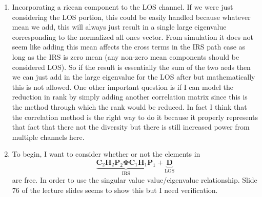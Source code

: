 \documentclass[12pt,a4paper]{report}
\begin{document}
\begin{enumerate}
 \item
 Incorporating a ricean component to the LOS channel. If we were just considering the LOS portion, this could be
 easily handled because whatever mean we add, this will always just result in a single large eigenvalue corresponding to the normalized all ones vector. From simulation it does not seem like adding this mean affects the cross terms in the IRS path case as long as the IRS is zero mean (any non-zero mean components should be considered LOS).
 So if the result is essentially the sum of the two aeds then we can just add in the large eigenvalue for the LOS after but mathematically this is not allowed. One other important question is if I can model the reduction in rank by simply adding another correlation matrix since this is the method through which the rank would be reduced. In fact I think that the correlation method is the right way to do it because it properly represents that fact that there not the diversity but there is still increased power from multiple channels here.
 
\item 
To begin, I want to consider whether or not the elements in 
\begin{equation}
\underbrace{\mathbf{C}_{2}\mathbf{H}_{2}\mathbf{P}_{2}\boldsymbol{\Phi}\mathbf{C}_{1}\mathbf{H}_{1}\mathbf{P}_{1}}_{\text{IRS}} + \underbrace{\mathbf{D}}_{\text{LOS} }
\end{equation}
are free. In order to use the singular value value/eigenvalue relationship.
Slide 76 of the lecture slides seems to show this but I need verification.


\end{enumerate}
\end{document}
